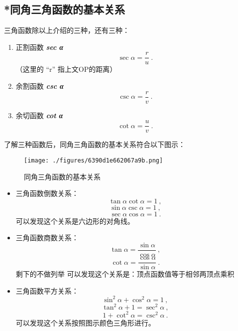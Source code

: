 \subsection{*同角三角函数的基本关系}
三角函数除以上介绍的三种，还有三种：
\begin{enumerate}
\item 正割函数 \textbf{\textsl{sec α}} 
\begin{equation}
\sec \alpha = \frac{r}{u}~.
\end{equation}
（这里的 “r” 指上文OP的距离）
\item 余割函数 \textbf{\textsl{csc α}} 
\begin{equation}
\csc \alpha = \frac{r}{v}~.
\end{equation}
\item 余切函数 \textbf{\textsl{cot α}} 
\begin{equation}
\cot \alpha = \frac{u}{v}~.
\end{equation}
\end{enumerate}
了解三种函数后，同角三角函数的基本关系符合以下图示：
\begin{figure}[ht]
\centering
\texttt{[image: ./figures/6390d1e662067a9b.png]}
\caption{同角三角函数的基本关系} \label{fig_HsTrFu_4}
\end{figure}
\begin{itemize}
\item 三角函数倒数关系：
\begin{equation}
\tan \alpha  \cot \alpha = 1~,
\end{equation}
\begin{equation}
\sin \alpha  \csc \alpha = 1~,
\end{equation}
\begin{equation}
\sec \alpha  \cos \alpha = 1~.
\end{equation}
可以发现这个关系是六边形的对角线。
\item 三角函数商数关系：
\begin{equation}
\tan \alpha = \frac{\sin \alpha}{\cos \alpha}~,
\end{equation}
\begin{equation}
\cot \alpha = \frac{\cos \alpha}{\sin \alpha}~.
\end{equation}
剩下的不做列举
可以发现这个关系是：顶点函数值等于相邻两顶点乘积
\item 三角函数平方关系：
\begin{equation}
\sin ^{2} \alpha + \cos ^{2}\alpha =1~,
\end{equation}
\begin{equation}
\tan  ^{2} \alpha + 1 =\sec ^{2}\alpha~,
\end{equation}
\begin{equation}
1 + \cot ^{2}\alpha =\csc ^{2}\alpha~.
\end{equation}
可以发现这个关系按照图示颜色三角形进行。
\end{itemize}
